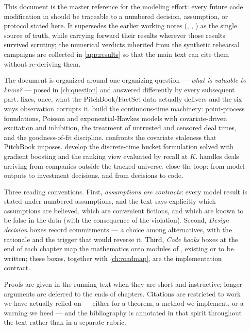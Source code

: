 
This document is the master reference for the  modeling
effort: every future code modification in \modrepo{} should be traceable to a
numbered decision, assumption, or protocol stated here. It supersedes the
earlier working notes (, ,
) as the single source of truth, while carrying forward
their results wherever those results survived scrutiny; the numerical
verdicts inherited from the synthetic rehearsal campaigns are collected in
\cref{app:results} so that the main text can cite them without re-deriving
them.

The document is organized around one organizing question --- \emph{what is
valuable to know?} --- posed in \cref{ch:question} and answered differently
by every subsequent part.  fixes, once, what the
PitchBook/FactSet data actually delivers and the six ways observation
corrupts it. 
build the continuous-time machinery: point-process foundations, Poisson and
exponential-Hawkes models with covariate-driven excitation and inhibition,
the treatment of untrusted and censored deal times, and the goodness-of-fit
discipline.  confronts the covariate staleness that PitchBook
imposes.  develop the discrete-time bucket
formulation solved with gradient boosting and the ranking view evaluated by
recall at $K$.  handles deals arriving from companies
outside the tracked universe.  close the loop:
from model outputs to investment decisions, and from decisions to code.

Three reading conventions. First, \emph{assumptions are contracts}: every
model result is stated under numbered assumptions, and the text says
explicitly which assumptions are believed, which are convenient fictions,
and which are known to be false in the data (with the consequence of the
violation). Second, \emph{Design decision} boxes record commitments --- a
choice among alternatives, with the rationale and the trigger that would
reverse it. Third, \emph{Code hooks} boxes at the end of each chapter map
the mathematics onto modules of \modrepo{}, existing or to be written; these
boxes, together with \cref{ch:roadmap}, are the implementation contract.

Proofs are given in the running text when they are short and instructive;
longer arguments are deferred to the ends of chapters. Citations are
restricted to work we have actually relied on --- either for a theorem, a
method we implement, or a warning we heed --- and the bibliography is
annotated in that spirit throughout the text rather than in a separate
rubric.
